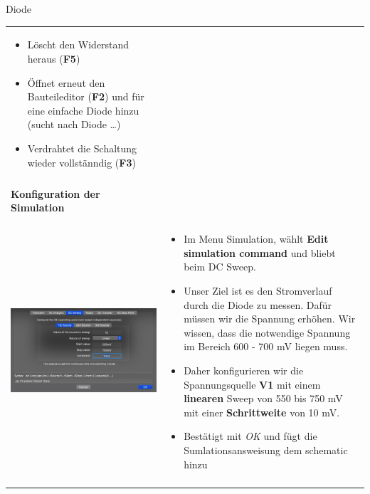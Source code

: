 \begin{frame}[t]{Diode}
\begin{spacing}{0.9}
\begin{tiny}
\begin{table}[h!]
\begin{tabular}{p{3cm} p{7cm}}
\begin{minipage}{.7\textwidth}
\begin{itemize}
              \item Löscht den Widerstand heraus (\textbf{F5})
              \item Öffnet erneut den Bauteileditor (\textbf{F2}) und für eine einfache Diode hinzu (sucht nach Diode \dots)
              \item Verdrahtet die Schaltung wieder vollstänndig (\textbf{F3})
            \end{itemize}
          \end{minipage}
          \\
                                                & \\
          \hline
          \textbf{Konfiguration der Simulation} & \\
          \hline                                  \\
          \begin{minipage}{.3\textwidth}
            \includegraphics[width=\linewidth]{pictures/simulationcmd_2.png}
          \end{minipage}
                                                &
          \begin{minipage}{.7\textwidth}
            \begin{itemize}
              \item Im Menu Simulation, wählt \textbf{Edit simulation command} und bliebt beim DC Sweep.
              \item Unser Ziel ist es den Stromverlauf durch die Diode zu messen. Dafür müssen wir die Spannung erhöhen.
                    Wir wissen, dass die notwendige Spannung im Bereich 600 - 700 mV liegen muss.
              \item Daher konfigurieren wir die Spannungsquelle \textbf{V1} mit einem \textbf{linearen} Sweep von 550 bis 750 mV mit einer \textbf{Schrittweite} von 10 mV.
              \item Bestätigt mit \textit{OK} und fügt die Sumlationsansweisung dem schematic hinzu
            \end{itemize}
          \end{minipage}
          \\
                                                & \\
          \hline
        \end{tabular}


\end{table}
\end{tiny}
\end{spacing}
\end{frame}

